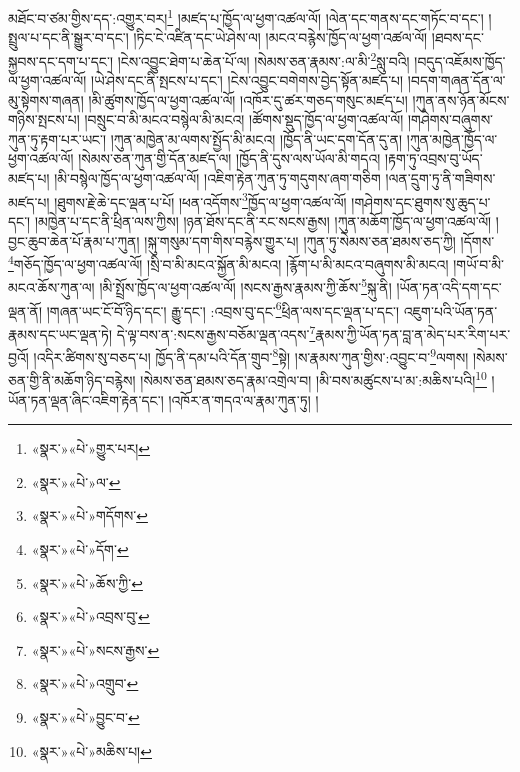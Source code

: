 མཐོང་བ་ཙམ་གྱིས་དད་:འགྱུར་བར།\footnote{«སྣར་»«པེ་»གྱུར་པར།} །མཛད་པ་ཁྱོད་ལ་ཕྱག་འཚལ་ལོ། །ལེན་དང་གནས་དང་གཏོང་བ་དང་། །སྤྲུལ་པ་དང་ནི་སྒྱུར་བ་དང་། །ཏིང་ངེ་འཛིན་དང་ཡེ་ཤེས་ལ། །མངའ་བརྙེས་ཁྱོད་ལ་ཕྱག་འཚལ་ལོ། །ཐབས་དང་སྐྱབས་དང་དག་པ་དང་། །ངེས་འབྱུང་ཐེག་པ་ཆེན་པོ་ལ། །སེམས་ཅན་རྣམས་:ལ་མི་\footnote{«སྣར་»«པེ་»ལ་}སླུ་བའི། །བདུད་འཇོམས་ཁྱོད་ལ་ཕྱག་འཚལ་ལོ། །ཡེ་ཤེས་དང་ནི་སྤངས་པ་དང་། །ངེས་འབྱུང་བགེགས་བྱེད་སྟོན་མཛད་པ། །བདག་གཞན་དོན་ལ་མུ་སྟེགས་གཞན། །མི་ཚུགས་ཁྱོད་ལ་ཕྱག་འཚལ་ལོ། །འཁོར་དུ་ཚར་གཅད་གསུང་མཛད་པ། །ཀུན་ནས་ཉོན་མོངས་གཉིས་སྤངས་པ། །བསྲུང་བ་མི་མངའ་བསྙེལ་མི་མངའ། །ཚོགས་སྡུད་ཁྱོད་ལ་ཕྱག་འཚལ་ལོ། །གཤེགས་བཞུགས་ཀུན་ཏུ་རྟག་པར་ཡང་། །ཀུན་མཁྱེན་མ་ལགས་སྤྱོད་མི་མངའ། །ཁྱོད་ནི་ཡང་དག་དོན་དུ་ན། །ཀུན་མཁྱེན་ཁྱོད་ལ་ཕྱག་འཚལ་ལོ། །སེམས་ཅན་ཀུན་གྱི་དོན་མཛད་ལ། །ཁྱོད་ནི་དུས་ལས་ཡོལ་མི་གདའ། །རྟག་ཏུ་འབྲས་བུ་ཡོད་མཛད་པ། །མི་བསྙེལ་ཁྱོད་ལ་ཕྱག་འཚལ་ལོ། །འཇིག་རྟེན་ཀུན་ཏུ་གདུགས་ཞག་གཅིག །ལན་དྲུག་ཏུ་ནི་གཟིགས་མཛད་པ། །ཐུགས་རྗེ་ཆེ་དང་ལྡན་པ་པོ། །ཕན་འདོགས་\footnote{«སྣར་»«པེ་»གདོགས་}ཁྱོད་ལ་ཕྱག་འཚལ་ལོ། །གཤེགས་དང་ཐུགས་སུ་ཆུད་པ་དང་། །མཁྱེན་པ་དང་ནི་ཕྲིན་ལས་ཀྱིས། །ཉན་ཐོས་དང་ནི་རང་སངས་རྒྱས། །ཀུན་མཆོག་ཁྱོད་ལ་ཕྱག་འཚལ་ལོ། །བྱང་ཆུབ་ཆེན་པོ་རྣམ་པ་ཀུན། །སྐུ་གསུམ་དག་གིས་བརྙེས་གྱུར་པ། །ཀུན་ཏུ་སེམས་ཅན་ཐམས་ཅད་ཀྱི། །དོགས་\footnote{«སྣར་»«པེ་»དོག་}གཅོད་ཁྱོད་ལ་ཕྱག་འཚལ་ལོ། །སྲི་བ་མི་མངའ་སྐྱོན་མི་མངའ། །རྙོག་པ་མི་མངའ་བཞུགས་མི་མངའ། །གཡོ་བ་མི་མངའ་ཆོས་ཀུན་ལ། །མི་སྤྲོས་ཁྱོད་ལ་ཕྱག་འཚལ་ལོ། །སངས་རྒྱས་རྣམས་ཀྱི་ཆོས་\footnote{«སྣར་»«པེ་»ཆོས་ཀྱི་}སྐུ་ནི། །ཡོན་ཏན་འདི་དག་དང་ལྡན་ནོ། །གཞན་ཡང་ངོ་བོ་ཉིད་དང་། རྒྱུ་དང་། :འབྲས་བུ་དང་\footnote{«སྣར་»«པེ་»འབྲས་བུ་}ཕྲིན་ལས་དང་ལྡན་པ་དང་། འཇུག་པའི་ཡོན་ཏན་རྣམས་དང་ཡང་ལྡན་ཏེ། དེ་ལྟ་བས་ན་:སངས་རྒྱས་བཅོམ་ལྡན་འདས་\footnote{«སྣར་»«པེ་»སངས་རྒྱས་}རྣམས་ཀྱི་ཡོན་ཏན་བླ་ན་མེད་པར་རིག་པར་བྱའོ། །འདིར་ཚིགས་སུ་བཅད་པ། ཁྱོད་ནི་དམ་པའི་དོན་གྲུབ་\footnote{«སྣར་»«པེ་»འགྲུབ་}སྟེ། །ས་རྣམས་ཀུན་གྱིས་:འབྱུང་བ་\footnote{«སྣར་»«པེ་»བྱུང་བ་}ལགས། །སེམས་ཅན་གྱི་ནི་མཆོག་ཉིད་བརྙེས། །སེམས་ཅན་ཐམས་ཅད་རྣམ་འགྲེལ་བ། །མི་བས་མཚུངས་པ་མ་:མཆིས་པའི།\footnote{«སྣར་»«པེ་»མཆིས་པ།} །ཡོན་ཏན་ལྡན་ཞིང་འཇིག་རྟེན་དང་། །འཁོར་ན་གདའ་ལ་རྣམ་ཀུན་ཏུ། །
